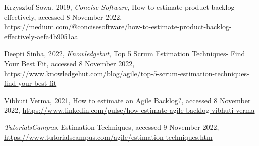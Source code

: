 {\begin{latin}
\begin{thebibliography}{9}
		Krzysztof Sowa,
		2019,
		\textit{Concise Software},
		How to estimate product backlog effectively, 
		accessed 8 November 2022,
		\url{https://medium.com/@concisesoftware/how-to-estimate-product-backlog-effectively-aefa4b9051aa}
		
		Deepti Sinha,
		2022,
		\textit{Knowledgehut},
		Top 5 Scrum Estimation Techniques- Find Your Best Fit, 
		accessed 8 November 2022,
		\url{https://www.knowledgehut.com/blog/agile/top-5-scrum-estimation-techniques-find-your-best-fit}
		
		Vibhuti Verma,
		2021,
		How to estimate an Agile Backlog?,
		accessed 8 November 2022,
		\url{	https://www.linkedin.com/pulse/how-estimate-agile-backlog-vibhuti-verma}

		\textit{TutorialsCampus},
		Estimation Techniques,
		accessed 9 November 2022,
		\url{	https://www.tutorialscampus.com/agile/estimation-techniques.htm}
	
	\end{thebibliography}
	\endgroup
\end{latin}

}